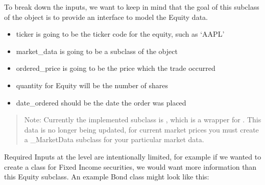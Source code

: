 \documentclass[letterpaper,10pt,english]{sphinxmanual}
\begin{document}
\sphinxAtStartPar
To break down the inputs, we want to keep in mind that the goal of this
subclass of the  object is to provide an interface to model
the Equity data.
\begin{itemize}
\item {} 
\sphinxAtStartPar
ticker is going to be the ticker code for the equity, such as ‘AAPL’

\item {} 
\sphinxAtStartPar
market\_data is going to be a subclass of the  object

\item {} 
\sphinxAtStartPar
ordered\_price is going to be the price which the trade occurred

\item {} 
\sphinxAtStartPar
quantity for Equity will be the number of shares

\item {} 
\sphinxAtStartPar
date\_ordered should be the date the order was placed

\end{itemize}
\begin{quote}

\sphinxAtStartPar
Note: Currently the implemented  subclass is
, which is a wrapper for . This data is no
longer being updated, for current market prices you must create a
\_MarketData subclass for your particular market data.
\end{quote}

\sphinxAtStartPar
Required Inputs at the  level are intentionally limited,
for example if we wanted to create a class for Fixed Income securities,
we would want more information than this Equity subclass. An example
Bond class might look like this:
\end{document}
